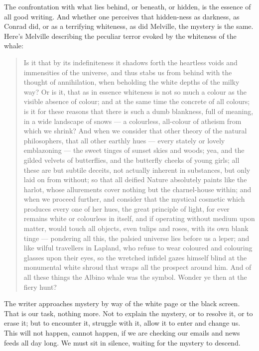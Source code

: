 \documentclass[letterpaper,oneside]{memoir}
\begin{document}
The confrontation with what lies behind, or beneath, or hidden, is the essence of all good writing. And whether one perceives that hidden-ness as darkness, as Conrad did, or as a terrifying whiteness, as did Melville, the mystery is the same. Here's Melville describing the peculiar terror evoked by the whiteness of the whale:
\begin{quotation}
  Is it that by its indefiniteness it shadows forth the heartless   voids and immensities of the universe, and thus stabs us from behind   with the thought of annihilation, when beholding the white depths of   the milky way? Or is it, that as in essence whiteness is not so much   a colour as the visible absence of colour; and at the same time the   concrete of all colours; is it for these reasons that there is such   a dumb blankness, full of meaning, in a wide landscape of snows ---   a colourless, all-colour of atheism from which we shrink? And when   we consider that other theory of the natural philosophers, that all   other earthly hues --- every stately or lovely emblazoning --- the   sweet tinges of sunset skies and woods; yea, and the gilded velvets   of butterflies, and the butterfly cheeks of young girls; all these   are but subtile deceits, not actually inherent in substances, but   only laid on from without; so that all deified Nature absolutely   paints like the harlot, whose allurements cover nothing but the   charnel-house within; and when we proceed further, and consider that   the mystical cosmetic which produces every one of her hues, the   great principle of light, for ever remains white or colourless in   itself, and if operating without medium upon matter, would touch all   objects, even tulips and roses, with its own blank tinge ---   pondering all this, the palsied universe lies before us a leper; and   like wilful travellers in Lapland, who refuse to wear coloured and   colouring glasses upon their eyes, so the wretched infidel gazes   himself blind at the monumental white shroud that wraps all the   prospect around him. And of all these things the Albino whale was   the symbol. Wonder ye then at the fiery hunt?
\end{quotation}

The writer approaches mystery by way of the white page or the black screen. That is our task, nothing more. Not to explain the mystery, or to resolve it, or to erase it; but to encounter it, struggle with it, allow it to enter and change us. This will not happen, cannot happen, if we are checking our emails and news feeds all day long. We must sit in silence, waiting for the mystery to descend.
\end{document}
